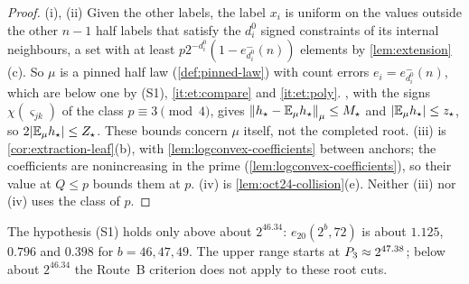 \begin{proof}
(i), (ii) Given the other labels, the label $x_i$ is uniform on the values
outside the other $n-1$ half labels that satisfy the $d^0_i$ signed constraints
of its internal neighbours, a set with at least
$p2^{-d^0_i}(1-e^-_{d^0_i}(n))$ elements by \cref{lem:extension}(c). So $\mu$ is a
pinned half law (\cref{def:pinned-law}) with count errors $e_i=e^-_{d^0_i}(n)$,
which are below one by (S1), \ref{it:et:compare} and \ref{it:et:poly}. , with
the signs $\chi(\varsigma_{jk})$ of the class $p\equiv3\pmod4$, gives
$\left\|h_\star-\mathbb E_\mu h_\star\right\|_\mu\le M_\star$ and $|\mathbb E_\mu h_\star|\le z_\star$, so
$2|\mathbb E_\mu h_\star|\le Z_\star$. These bounds concern $\mu$ itself, not the
completed root.
(iii) is \cref{cor:extraction-leaf}(b), with \cref{lem:logconvex-coefficients}
between anchors; the coefficients are nonincreasing in the prime
(\cref{lem:logconvex-coefficients}), so their value at $Q\le p$ bounds them at $p$.
(iv) is \cref{lem:oct24-collision}(e). Neither (iii) nor (iv) uses the class of $p$.
\end{proof}

The hypothesis (S1) holds only above about $2^{46.34}$: $e_{20}(2^b,72)$ is about
$1.125$, $0.796$ and $0.398$ for $b=46,47,49$. The upper range starts at
$P_3\approx2^{47.38}$; below about $2^{46.34}$ the Route~B criterion
does not apply to these root cuts.

